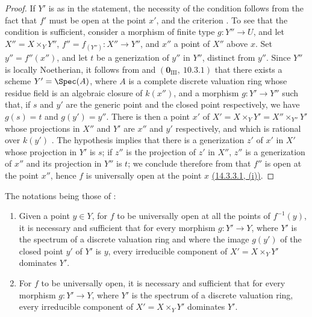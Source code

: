 \begin{proof}
If $Y'$ is as in the statement, the necessity of the condition follows from the fact that $f'$ must be open at the point $x'$, and the criterion .
To see that the condition is sufficient, consider a morphism of finite type $g:Y''\to U$, and let $X''=X\times_Y Y''$, $f''=f_{(Y'')}:X''\to Y''$, and $x''$ a point of $X''$ above $x$.
Set $y''=f''(x'')$, and let $t$ be a generization of $y''$ in $Y''$, distinct from $y''$.
Since $Y''$ is locally Noetherian, it follows from  and $(\mathbf{0}_{\mathrm{III}},~10.3.1)$ that there exists a scheme $Y'=\Spec(A)$, where $A$ is a complete discrete valuation ring whose residue field is an algebraic closure of $k(x'')$, and a morphism $g:Y'\to Y''$ such that, if $s$ and $y'$ are the generic point and the closed point respectively, we have $g(s)=t$ and $g(y')=y''$.
There is then a point $x'$ of $X'=X\times_Y Y'=X''\times_{Y''}Y'$ whose projections in $X''$ and $Y'$ are $x''$ and $y'$ respectively, and which is rational over $k(y')$ .
The hypothesis implies that there is a generization $z'$ of $x'$ in $X'$ whose projection in $Y'$ is $s$; if $z''$ is the projection of $z'$ in $X''$, $z''$ is a generization of $x''$ and its projection in $Y''$ is $t$; we conclude therefore from  that $f''$ is open at the point $x''$, hence $f$ is universally open at the point $x$ {\hyperlink{ega4.c04.subsec.14-3-3-1}{(14.3.3.1, (i))}}.
\end{proof}

\begin{corollary}[14.3.7]
\label{IV.14.3.7}
The notations being those of :
\begin{enumerate}[label=(\roman*)]
  \item Given a point $y\in Y$, for $f$ to be universally open at all the points of $f^{-1}(y)$, it is necessary and sufficient that for every morphism $g:Y'\to Y$, where $Y'$ is the spectrum of a discrete valuation ring and where the image $g(y')$ of the closed point $y'$ of $Y'$ is $y$, every irreducible component of $X'=X\times_Y Y'$ dominates $Y'$.
  \item For $f$ to be universally open, it is necessary and sufficient that for every morphism $g:Y'\to Y$, where $Y'$ is the spectrum of a discrete valuation ring, every irreducible component of $X'=X\times_Y Y'$ dominates $Y'$.
\end{enumerate}
\end{corollary}

